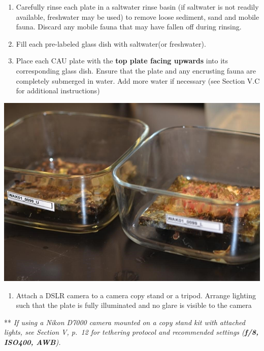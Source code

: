 \documentclass[
]{book}
\providecommand{\tightlist}{%
  \setlength{\itemsep}{0pt}\setlength{\parskip}{0pt}}
\begin{document}
\begin{enumerate}
\def\labelenumi{\arabic{enumi}.}
\setcounter{enumi}{2}
\item
  Carefully rinse each plate in a saltwater rinse basin (if saltwater is not readily available, freshwater may be used) to remove loose sediment, sand and mobile fauna. Discard any mobile fauna that may have fallen off during rinsing.
\item
  Fill each pre-labeled glass dish with saltwater(or freshwater).
\item
  Place each CAU plate with the \textbf{top plate facing upwards} into its corresponding glass dish. Ensure that the plate and any encrusting fauna are completely submerged in water. Add more water if necessary (see Section V.C for additional instructions)
\end{enumerate}

\includegraphics{images/CAU_dried.jpg}

\begin{enumerate}
\def\labelenumi{\arabic{enumi}.}
\setcounter{enumi}{5}
\tightlist
\item
  Attach a DSLR camera to a camera copy stand or a tripod. Arrange lighting such that the plate is fully illuminated and no glare is visible to the camera
\end{enumerate}

** \emph{If using a Nikon D7000 camera mounted on a copy stand kit with attached lights, see Section V, p.~12 for tethering protocol and recommended settings (\textbf{f/8, ISO400, AWB}).}
\end{document}
